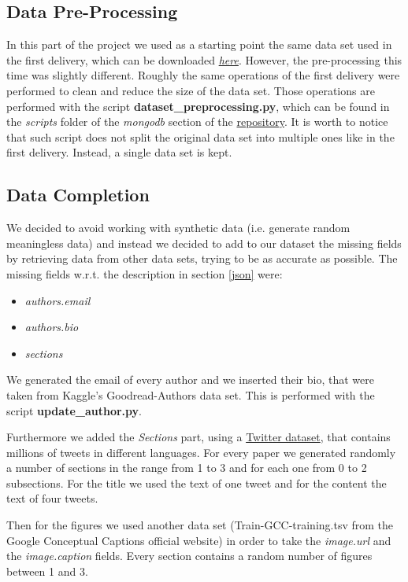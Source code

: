 \documentclass{Configuration_Files/PoliMi3i_thesis}
\begin{document}
\subsection{Data Pre-Processing}
In this part of the project we used as a starting point the same data set used in the first delivery, which can be downloaded \href{https://lfs.AMiner.cn/misc/dblp.v11.zip}{\textit{here}}. 
However, the pre-processing this time was slightly different. 
Roughly the same operations of the first delivery were performed to clean and reduce the size of the data set. Those operations are performed with the script \textbf{dataset\_preprocessing.py}, which can be found in the \textit{scripts} folder of the \textit{mongodb} section of the \href{https://github.com/albertopirillo/smbud-project-2022}{repository}.
It is worth to notice that such script does not split the original data set into multiple ones like in the first delivery. Instead, a single data set is kept.

\subsection{Data Completion}
We decided to avoid working with synthetic data (i.e. generate random meaningless data) and instead we decided to add to our dataset the missing fields by retrieving data from other data sets, trying to be as accurate as possible. The missing fields w.r.t. the description in section \ref{json} were:
\begin{itemize} 
    \item \textit{authors.email}
    \item \textit{authors.bio}
    \item \textit{sections}
\end{itemize}

We generated the email of every author and we inserted their bio, that were taken from Kaggle's Goodread-Authors data set. This is performed with the script \textbf{update\_author.py}.

Furthermore we added the \textit{Sections} part, using a  \href{https://transparency.twitter.com/en/reports/moderation-research.html}{Twitter dataset}, that contains millions of tweets in different languages. For every paper we generated randomly a number of sections in the range from 1 to 3 and for each one from 0 to 2 subsections. For the title we used the text of one tweet and for the content the text of four tweets.

Then for the figures we used another data set (Train-GCC-training.tsv from the Google Conceptual Captions official website) in order to take the \textit{image.url} and the \textit{image.caption} fields. Every section contains a random number of figures between 1 and 3.
\end{document}
